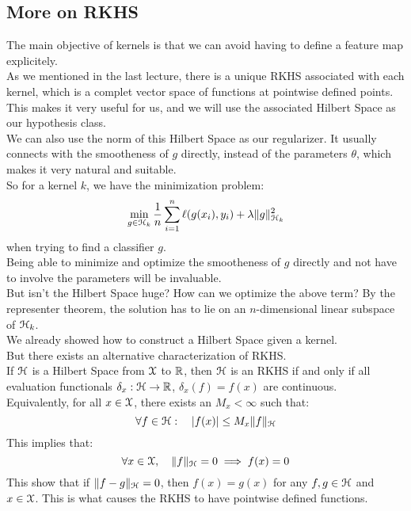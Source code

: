 \documentclass[12pt]{article}
\begin{document}
\newpage

\subsection*{More on RKHS}

The main objective of kernels
is that we can avoid having to define
a feature map explicitely. \\

As we mentioned in the last lecture,
there is a unique RKHS associated with each
kernel, which is a complet vector space
of functions at pointwise defined points. \\
This makes it very useful for us, and we
will use the associated Hilbert Space
as our hypothesis class. \\
We can also use the norm of this
Hilbert Space as our regularizer.
It usually connects with the smootheness
of $g$ directly, instead of the parameters
$\theta$, which makes it very natural
and suitable. \\

So for a kernel $k$, we have the minimization problem:
\[ \min_{g \in \mathcal{H}_k} \dfrac{1}{n}\sum_{i=1}^n 
\ell(g(x_i), y_i) + \lambda \| g \|_{\mathcal{H}_k}^2 \]
when trying to find a classifier $g$. \\

Being able to minimize and optimize the smootheness
of $g$ directly and not have to involve the parameters
will be invaluable. \\

But isn't the Hilbert Space huge? How
can we optimize the above term?
By the representer theorem, 
the solution has to lie on an $n$-dimensional
linear subspace of $\mathcal{H}_k$. \\

We already showed how to construct a Hilbert Space
given a kernel. \\
But there exists an alternative characterization
of RKHS. \\
If $\mathcal{H}$ is a Hilbert Space from $\mathcal{X}$ to $\mathbb{R}$,
then $\mathcal{H}$ is an RKHS if and only if all evaluation
functionals $\delta_x: \mathcal{H} \to \mathbb{R}$, 
$\delta_x(f) = f(x)$ are continuous. \\
Equivalently, for all $x \in \mathcal{X}$,
there exists an $M_x < \infty$ such that:
\[ \forall f \in \mathcal{H}: \quad |f(x)| \leq 
M_x\|f\|_{\mathcal{H}}  \]
This implies that:
\[ \forall x \in \mathcal{X}, 
\quad \|f\|_{\mathcal{H}} = 0 \implies f(x) = 0 \]
This show that if $\|f-g\|_{\mathcal{H}} = 0$,
then $f(x) = g(x)$ for any $f, g \in \mathcal{H}$
and $x \in \mathcal{X}$. This is what causes the RKHS
to have pointwise defined functions. \\
\end{document}
